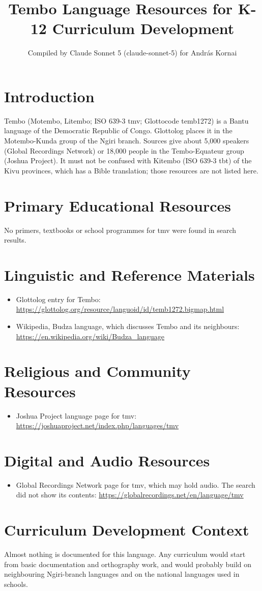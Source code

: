 \documentclass[12pt]{article}
\title{Tembo Language Resources for K-12 Curriculum Development}
\author{Compiled by Claude Sonnet 5 (claude-sonnet-5) for Andr\'as Kornai}
\date{}
\begin{document}
\maketitle

\section{Introduction}
Tembo (Motembo, Litembo; ISO 639-3 tmv; Glottocode temb1272) is a Bantu language of the Democratic Republic of Congo. Glottolog places it in the Motembo-Kunda group of the Ngiri branch. Sources give about 5{,}000 speakers (Global Recordings Network) or 18{,}000 people in the Tembo-Equateur group (Joshua Project). It must not be confused with Kitembo (ISO 639-3 tbt) of the Kivu provinces, which has a Bible translation; those resources are not listed here.

\section{Primary Educational Resources}
No primers, textbooks or school programmes for tmv were found in search results.

\section{Linguistic and Reference Materials}
\begin{itemize}
\item Glottolog entry for Tembo: \url{https://glottolog.org/resource/languoid/id/temb1272.bigmap.html}
\item Wikipedia, Budza language, which discusses Tembo and its neighbours: \url{https://en.wikipedia.org/wiki/Budza_language}
\end{itemize}

\section{Religious and Community Resources}
\begin{itemize}
\item Joshua Project language page for tmv: \url{https://joshuaproject.net/index.php/languages/tmv}
\end{itemize}

\section{Digital and Audio Resources}
\begin{itemize}
\item Global Recordings Network page for tmv, which may hold audio. The search did not show its contents: \url{https://globalrecordings.net/en/language/tmv}
\end{itemize}

\section{Curriculum Development Context}
Almost nothing is documented for this language. Any curriculum would start from basic documentation and orthography work, and would probably build on neighbouring Ngiri-branch languages and on the national languages used in schools.
\end{document}

